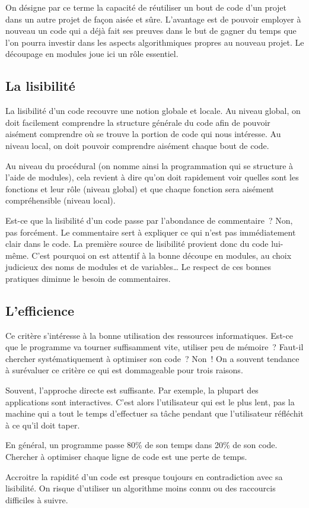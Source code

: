 	{On désigne par ce terme la capacité de réutiliser 
	un bout de code d’un projet dans un autre projet de 
	façon aisée et sûre. L’avantage est de pouvoir employer 
	à nouveau un code qui a déjà fait ses preuves dans le 
	but de gagner du temps que l’on pourra investir dans les 
	aspects algorithmiques propres au nouveau projet. 
	Le découpage en modules joue ici un rôle essentiel.}

\subsection{La lisibilité}

	{
	La lisibilité d’un code recouvre une notion globale et
	locale. Au niveau global, on doit facilement comprendre la structure
	générale du code afin de pouvoir aisément comprendre où se trouve 
	la portion de code qui nous intéresse. 
	Au niveau local, on doit pouvoir comprendre
	aisément chaque bout de code.}

	{
	Au niveau du procédural (on nomme ainsi la programmation qui se
	structure à l’aide de modules), cela revient à dire
	qu’on doit rapidement voir quelles sont les fonctions et
	leur rôle (niveau global) et que chaque fonction sera aisément
	compréhensible (niveau local).}
	
	{
	Est-ce que la lisibilité d’un code passe par
	l’abondance de commentaire~? Non, pas forcément. Le
	commentaire sert à expliquer ce qui n’est pas
	immédiatement clair dans le code. La première source de lisibilité
	provient donc du code lui-même. C’est pourquoi on est
	attentif à la bonne découpe en modules, au choix judicieux des noms de
    modules et de variables\dots{} Le respect de ces bonnes pratiques diminue
	le besoin de commentaires.}
	
\subsection{L’efficience}

	{
	Ce critère s’intéresse à la bonne utilisation des
	ressources informatiques. Est-ce que le programme va tourner
	suffisamment vite, utiliser peu de mémoire~? Faut-il chercher
	systématiquement à optimiser son code~? Non~! On a souvent tendance à
	surévaluer ce critère ce qui est dommageable pour trois raisons.}

	\begin{liste}
	\item {
		Souvent, l’approche directe est suffisante. Par
		exemple, la plupart des applications sont interactives.
		C’est alors l’utilisateur qui est le plus lent, pas la
		machine qui a tout le temps d’effectuer sa tâche
		pendant que l’utilisateur réfléchit à ce qu’il doit
		taper.}
	\item {
		En général, un programme passe 80\% de son temps dans 20\% de son code.
		Chercher à optimiser chaque ligne de code est une perte de temps.}
	\item {
		Accroitre la rapidité d’un code est presque toujours en
		contradiction avec sa lisibilité. On risque d’utiliser un algorithme moins
		connu ou des raccourcis difficiles à suivre.}
	\end{liste}

